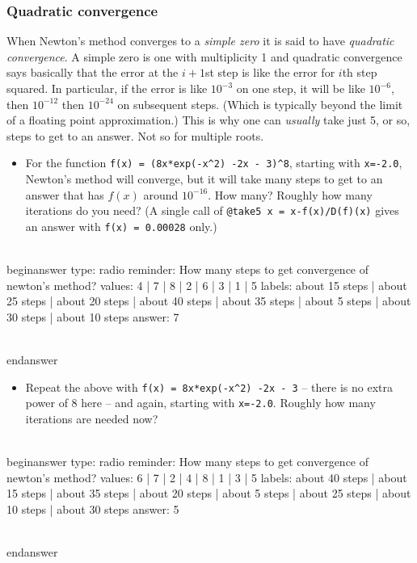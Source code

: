 \documentclass[12pt]{article}
\begin{document}
\subsubsection{Quadratic convergence}\newline
When Newton's method converges to a \textit{simple zero} it is said to have \textit{quadratic convergence}. A simple zero is one with multiplicity 1 and quadratic convergence says basically that the error at the $i+1$st step is like the error for $i$th step squared. In particular, if the error is like $10^{-3}$ on one step, it will be like $10^{-6}$, then $10^{-12}$ then $10^{-24}$ on subsequent steps. (Which is typically beyond the limit of a floating point approximation.) This is why one can \textit{usually} take just 5, or so, steps to get to an answer.\newline
Not so for multiple roots. \begin{itemize}\item For the function \texttt{f(x) = (8x*exp(-x^2) -2x - 3)^8}, starting with   \texttt{x=-2.0}, Newton's method will converge, but it will take many steps   to get to an answer that has $f(x)$ around $10^{-16}$. How many?   Roughly how many iterations do you need? (A single call of    \texttt{@take5 x = x-f(x)/D(f)(x)} gives an answer with \texttt{f(x) = 0.00028} only.)\end{itemize}
\\begin{answer}
type: radio
reminder: How many steps to get convergence of newton's method?
values: 4 | 7 | 8 | 2 | 6 | 3 | 1 | 5
labels: about 15 steps | about 25 steps | about 20 steps | about 40 steps | about 35 steps | about 5 steps | about 30 steps | about 10 steps
answer: 7

\\end{answer}
\begin{itemize}\item Repeat the above with \texttt{f(x) = 8x*exp(-x^2) -2x - 3} – there is no   extra power of $8$ here – and again, starting with   \texttt{x=-2.0}. Roughly how many iterations are needed now?\end{itemize}
\\begin{answer}
type: radio
reminder: How many steps to get convergence of newton's method?
values: 6 | 7 | 2 | 4 | 8 | 1 | 3 | 5
labels: about 40 steps | about 15 steps | about 35 steps | about 20 steps | about 5 steps | about 25 steps | about 10 steps | about 30 steps
answer: 5

\\end{answer}
\end{document}
